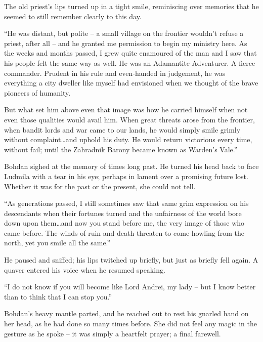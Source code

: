  

The old priest’s lips turned up in a tight smile, reminiscing over memories that he seemed to still remember clearly to this day.

 

“He was distant, but polite – a small village on the frontier wouldn’t refuse a priest, after all – and he granted me permission to begin my ministry here. As the weeks and months passed, I grew quite enamoured of the man and I saw that his people felt the same way as well. He was an Adamantite Adventurer. A fierce commander. Prudent in his rule and even-handed in judgement, he was everything a city dweller like myself had envisioned when we thought of the brave pioneers of humanity.

 

But what set him above even that image was how he carried himself when not even those qualities would avail him. When great threats arose from the frontier, when bandit lords and war came to our lands, he would simply smile grimly without complaint…and uphold his duty. He would return victorious every time, without fail; until the Zahradnik Barony became known as Warden’s Vale.”

 

Bohdan sighed at the memory of times long past. He turned his head back to face Ludmila with a tear in his eye; perhaps in lament over a promising future lost. Whether it was for the past or the present, she could not tell.

 

“As generations passed, I still sometimes saw that same grim expression on his descendants when their fortunes turned and the unfairness of the world bore down upon them…and now you stand before me, the very image of those who came before. The winds of ruin and death threaten to come howling from the north, yet you smile all the same.”

 

He paused and sniffed; his lips twitched up briefly, but just as briefly fell again. A quaver entered his voice when he resumed speaking.

 

“I do not know if you will become like Lord Andrei, my lady – but I know better than to think that I can stop you.”

 

Bohdan’s heavy mantle parted, and he reached out to rest his gnarled hand on her head, as he had done so many times before. She did not feel any magic in the gesture as he spoke – it was simply a heartfelt prayer; a final farewell.

